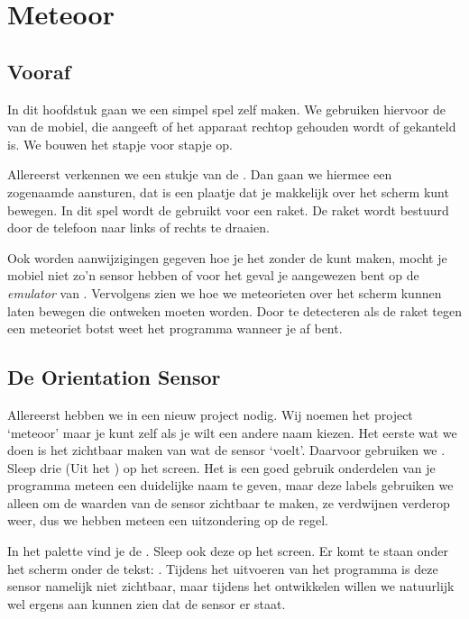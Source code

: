 \chapter{Meteoor}

\section{Vooraf}
In dit hoofdstuk gaan we een simpel spel zelf maken. We gebruiken hiervoor de  van de mobiel, die aangeeft of het apparaat rechtop gehouden wordt of gekanteld is. We bouwen het stapje voor stapje op. 

Allereerst verkennen we een stukje van de 
\linebreak {}. Dan gaan we hiermee een zogenaamde 
{} aansturen, dat is een plaatje dat je makkelijk over het scherm kunt bewegen. In dit spel wordt de  gebruikt voor een raket. De raket wordt bestuurd door de telefoon naar links of rechts te draaien. 

Ook worden aanwijzigingen gegeven hoe je het zonder de  kunt maken, mocht je mobiel niet zo'n sensor hebben of voor het geval je aangewezen bent op de \emph{emulator} van \ai. Vervolgens zien we hoe we meteorieten over het scherm kunnen laten bewegen die ontweken moeten worden. Door te detecteren als de raket tegen een meteoriet botst weet het programma wanneer je af bent.


\section{De Orientation Sensor}
Allereerst hebben we in \ai  een nieuw project nodig. Wij noemen het project `meteoor' maar je kunt zelf als je wilt een andere naam kiezen. 
Het eerste wat we doen is het zichtbaar maken van wat de sensor `voelt'. Daarvoor gebruiken we . Sleep drie  (Uit het ) op het screen. Het is een goed gebruik onderdelen van je programma meteen een duidelijke naam te geven, maar deze labels gebruiken we alleen om de waarden van de sensor zichtbaar te maken, ze verdwijnen verderop weer, dus we hebben meteen een uitzondering op de regel. 

In het palette  vind je de
\linebreak {}. Sleep ook deze op het screen. Er komt  te staan onder het scherm onder de tekst: . Tijdens het uitvoeren van het programma is deze sensor namelijk niet zichtbaar, maar tijdens het ontwikkelen willen we natuurlijk wel ergens aan kunnen zien dat de sensor er staat. 

